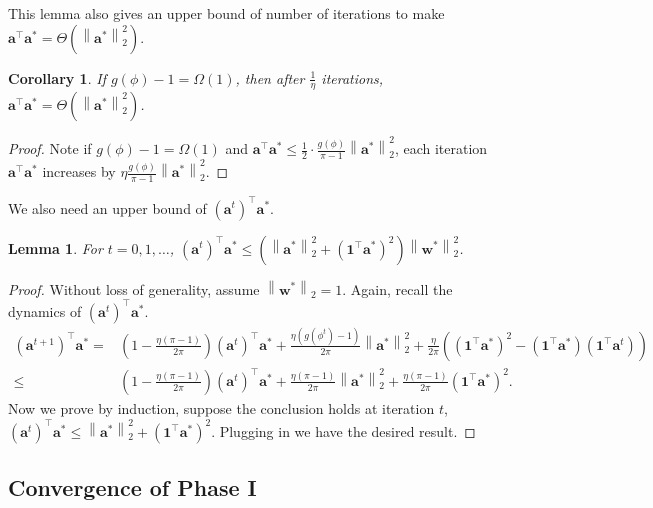 \documentclass{article}
\newcommand{\firstlayer}{w}
\newcommand{\secondlayer}{a}
\newcommand{\vect}[1]{\mathbf{#1}}
\newcommand{\norm}[1]{\left\|#1\right\|}
\newtheorem{lem}{Lemma}[section]
\newtheorem{cor}{Corollary}[section]
\begin{document}
This lemma also gives an upper bound of number of iterations to make $\vect{\secondlayer}^\top\vect{\secondlayer}^* = \Theta\left(\norm{\vect{\secondlayer}^*}_2^2\right)$.
\begin{cor}\label{cor:inner_prduct_convergences}
If $g(\phi) - 1 = \Omega\left(1\right)$, then after $\frac{1}{\eta}$ iterations, $\vect{\secondlayer}^\top\vect{\secondlayer}^* = \Theta\left(\norm{\vect{\secondlayer}^*}_2^2\right)$.
\end{cor}\begin{proof}
Note if $g(\phi) - 1 = \Omega\left(1\right)$ and $\vect{\secondlayer}^\top \vect{\secondlayer}^* \le \frac{1}{2}\cdot\frac{g(\phi)}{\pi-1}\norm{\vect{\secondlayer}^*}_2^2$, each iteration  $\vect{\secondlayer}^\top \vect{\secondlayer}^*$ increases by $\eta\frac{g(\phi)}{\pi-1}\norm{\vect{\secondlayer}^*}_2^2$.
\end{proof}We also need an upper bound of $\left(\vect{\secondlayer}^t\right)^\top\vect{\secondlayer}^*$.
\begin{lem}\label{lem:upper_bound_second_layer}
For $t=0,1,\ldots$, $\left(\vect{\secondlayer}^t\right)^\top \vect{\secondlayer}^* \le \left(\norm{\vect{\secondlayer}^*}_2^2+\left(\vect{1}^\top\vect{\secondlayer}^*\right)^2\right)\norm{\vect{\firstlayer}^*}_2^2$.
\end{lem}\begin{proof}
Without loss of generality, assume $\norm{\vect{\firstlayer}^*}_2=1$.
Again, recall the dynamics of $\left(\vect{\secondlayer}^t\right)^\top \vect{\secondlayer}^*$.
\begin{align*}
\left(\vect{\secondlayer}^{t+1}\right)^\top \vect{\secondlayer}^*  = & \left(1-\frac{\eta\left(\pi-1\right)}{2\pi}\right)\left(\vect{\secondlayer}^t\right)^\top \vect{\secondlayer}^* + \frac{\eta\left(g(\phi^t)-1\right)}{2\pi}\norm{\vect{\secondlayer}^*}_2^2 + \frac{\eta}{2\pi}\left(\left(\vect{1}^\top\vect{\secondlayer}^*\right)^2-\left(\vect{1}^\top\vect{\secondlayer}^*\right)\left(\vect{1}^\top \vect{\secondlayer}^t\right)\right) \\
\le & \left(1-\frac{\eta\left(\pi-1\right)}{2\pi}\right)\left(\vect{\secondlayer}^t\right)^\top\vect{\secondlayer}^* + \frac{\eta\left(\pi-1\right)}{2\pi}\norm{\vect{\secondlayer}^*}_2^2 + \frac{\eta\left(\pi-1\right)}{2\pi}\left(\vect{1}^\top\vect{\secondlayer}^*\right)^2.
\end{align*}
Now we prove by induction, suppose the conclusion holds at iteration $t$, $\left(\vect{\secondlayer}^t\right)^\top \vect{\secondlayer}^* \le \norm{\vect{\secondlayer}^*}_2^2+\left(\vect{1}^\top\vect{\secondlayer}^*\right)^2$.
Plugging in we have the desired result.
\end{proof}\subsection{Convergence of Phase I}\label{sec:proof_phase_1}
\end{document}
